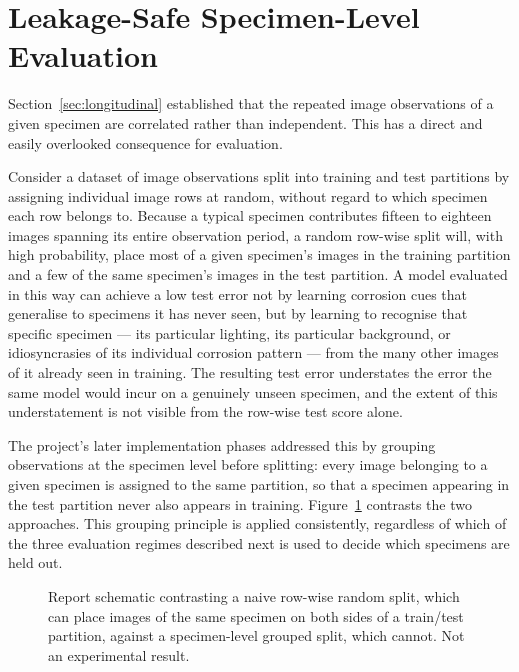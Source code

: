 \section{Leakage-Safe Specimen-Level Evaluation}
\label{sec:leakage}

Section~\ref{sec:longitudinal} established that the repeated image
observations of a given specimen are correlated rather than independent.
This has a direct and easily overlooked consequence for evaluation.

Consider a dataset of image observations split into training and test
partitions by assigning individual image rows at random, without regard
to which specimen each row belongs to. Because a typical specimen
contributes fifteen to eighteen images spanning its entire observation
period, a random row-wise split will, with high probability, place most
of a given specimen's images in the training partition and a few of the
same specimen's images in the test partition. A model evaluated in this
way can achieve a low test error not by learning corrosion cues that
generalise to specimens it has never seen, but by learning to recognise
that specific specimen — its particular lighting, its particular
background, or idiosyncrasies of its individual corrosion pattern — from
the many other images of it already seen in training. The resulting test
error understates the error the same model would incur on a genuinely
unseen specimen, and the extent of this understatement is not visible from
the row-wise test score alone.

The project's later implementation phases addressed this by grouping
observations at the specimen level before splitting: every image
belonging to a given specimen is assigned to the same partition, so that a
specimen appearing in the test partition never also appears in training.
Figure~\ref{fig:specimen-splitting} contrasts the two approaches. This
grouping principle is applied consistently, regardless of which of the
three evaluation regimes described next is used to decide which specimens
are held out.

\begin{figure}[htbp]
\centering
\resizebox{0.75\textwidth}{!}{}
\caption{Report schematic contrasting a naive row-wise random split, which
can place images of the same specimen on both sides of a train/test
partition, against a specimen-level grouped split, which cannot. Not an
experimental result.}
\label{fig:specimen-splitting}
\end{figure}

